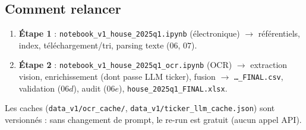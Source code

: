 \documentclass[11pt,a4paper]{article}
\newcommand{\file}[1]{\texttt{\small #1}}
\begin{document}
\subsection*{Comment relancer}
\begin{enumerate}
  \item \textbf{Étape 1} : \file{notebook\_v1\_house\_2025q1.ipynb} (électronique) $\to$
        référentiels, index, téléchargement/tri, parsing texte ($06$, $07$).
  \item \textbf{Étape 2} : \file{notebook\_v1\_house\_2025q1\_ocr.ipynb} (OCR) $\to$ extraction vision,
        enrichissement (dont passe LLM ticker), fusion $\to$ \file{\dots\_FINAL.csv}, validation
        ($06d$), audit ($06e$), \file{house\_2025q1\_FINAL.xlsx}.
\end{enumerate}
Les caches (\file{data\_v1/ocr\_cache/}, \file{data\_v1/ticker\_llm\_cache.json}) sont versionnés :
sans changement de prompt, le re-run est gratuit (aucun appel API).
\end{document}
